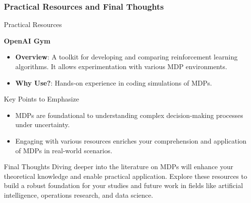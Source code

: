\documentclass[aspectratio=169]{beamer}
\begin{document}
\begin{frame}[fragile]
    \frametitle{Practical Resources and Final Thoughts}
    \begin{block}{Practical Resources}
        \item \textbf{OpenAI Gym}
        \begin{itemize}
            \item \textbf{Overview}: A toolkit for developing and comparing reinforcement learning algorithms. It allows experimentation with various MDP environments.
            \item \textbf{Why Use?}: Hands-on experience in coding simulations of MDPs.
        \end{itemize}
    \end{block}

    \begin{block}{Key Points to Emphasize}
        \begin{itemize}
            \item MDPs are foundational to understanding complex decision-making processes under uncertainty.
            \item Engaging with various resources enriches your comprehension and application of MDPs in real-world scenarios.
        \end{itemize}
    \end{block}
    
    \begin{block}{Final Thoughts}
        Diving deeper into the literature on MDPs will enhance your theoretical knowledge and enable practical application. Explore these resources to build a robust foundation for your studies and future work in fields like artificial intelligence, operations research, and data science.
    \end{block}
\end{frame}
\end{document}
